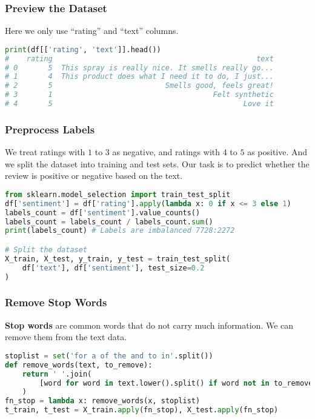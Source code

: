 \documentclass[beamer, en, version=2.0]{huangfusl-template}
\begin{document}
    \begin{frame}[fragile]
        \frametitle{Preview the Dataset}

        Here we only use ``rating'' and ``text'' columns.

\begin{lstlisting}[language=python]
print(df[['rating', 'text']].head())
#    rating                                               text
# 0       5  This spray is really nice. It smells really go...
# 1       4  This product does what I need it to do, I just...
# 2       5                          Smells good, feels great!
# 3       1                                     Felt synthetic
# 4       5                                            Love it
\end{lstlisting}
    \end{frame}

    \begin{frame}[fragile]
        \frametitle{Preprocess Labels}

        We treat ratings with $1$ to $3$ as negative, and ratings with $4$ to $5$ as positive. And we split the dataset into training and test sets. Our task is to predict whether the review is positive or negative based on the text.

\begin{lstlisting}[language=python, breaklines]
from sklearn.model_selection import train_test_split
df['sentiment'] = df['rating'].apply(lambda x: 0 if x <= 3 else 1)
labels_count = df['sentiment'].value_counts()
labels_count = labels_count / labels_count.sum()
print(labels_count) # Labels are imbalanced 7728:2272

# Split the dataset
X_train, X_test, y_train, y_test = train_test_split(
    df['text'], df['sentiment'], test_size=0.2
)
\end{lstlisting}
    \end{frame}

    \begin{frame}[fragile]
        \frametitle{Remove Stop Words}

        \textbf{Stop words} are common words that do not carry much information. We can remove them from the text data.

\begin{lstlisting}[language=python, breaklines]
stoplist = set('for a of the and to in'.split())
def remove_words(text, to_remove):
    return ' '.join(
        [word for word in text.lower().split() if word not in to_remove]
    )
fn_stop = lambda x: remove_words(x, stoplist)
t_train, t_test = X_train.apply(fn_stop), X_test.apply(fn_stop)
\end{lstlisting}
    \end{frame}
\end{document}
